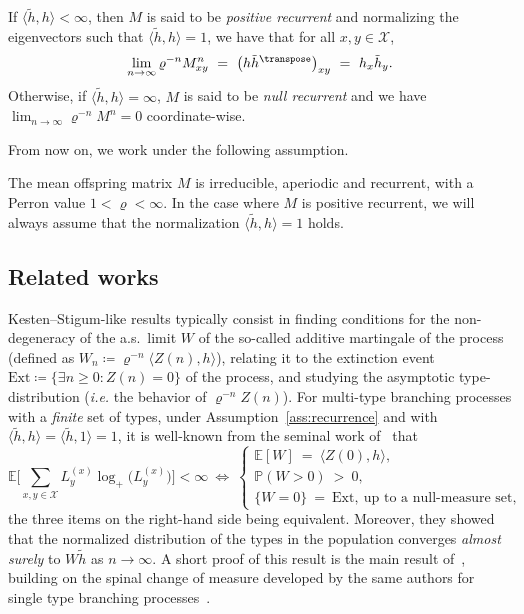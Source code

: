 \begin{refsegment}
\begin{prop}
  If $\langle \tilde{h}, h\rangle<\infty$, then  $M$ is said to be \emph{positive recurrent} and normalizing the eigenvectors such that $\langle \tilde{h}, h\rangle=1$, we have that for all $x,y\in \mathcal{X}$,
  \begin{equation*}
    \lim_{n\to\infty} \varrho^{-n}M^{n}_{xy}\ =\ \big(h\tilde{h}^\transpose\big)_{xy}\ =\  h_x\tilde{h}_y.
   \end{equation*}   
  Otherwise, if $\langle \tilde{h}, h\rangle=\infty$, $M$ is said to be \emph{null recurrent} and we have $\lim_{n\to\infty} \varrho^{-n}M^{n} = 0$ coordinate-wise.
\end{prop}
%
From now on, we work under the following assumption.
\begin{assumption}\label{ass:recurrence}
  The mean offspring matrix $M$ is irreducible, aperiodic and recurrent, with a Perron value $1<\varrho<\infty$. In the case where $M$ is positive recurrent, we will always assume that the normalization $\langle \tilde{h}, h\rangle=1$ holds.
\end{assumption}
%


\subsection*{Related works}
Kesten--Stigum-like results typically consist in finding conditions for the non-degeneracy of the a.s.\ limit $W$ of the so-called additive martingale of the process (defined as $W_n\coloneqq \varrho^{-n} \langle Z(n), h\rangle$), relating it to the extinction event $\mathrm{Ext}\coloneqq\{\exists n \geq 0 : Z(n)=0\}$ of the process, and studying the asymptotic type-distribution (\textit{i.e.} the behavior of $\varrho^{-n}Z(n)$).
For multi-type branching processes with a \textit{finite} set of types, under Assumption~\ref{ass:recurrence} and with $\langle  \tilde{h}, h \rangle=\langle \tilde{h} , 1\rangle =1$, it is well-known from the seminal work of~\cite{kesten_limit_1966} that 
\begin{equation*}
   \mathbb{E}\bigg[\sum_{x,y\in\mathcal{X}}L^{(x)}_y\log_+\big(L^{(x)}_y\big)\bigg]<\infty \ \Longleftrightarrow\  \begin{cases}
    \mathbb{E}[W]\ =\ \langle Z(0), h\rangle, \\ \mathbb{P}(W>0)\ >\ 0, \\ \{W=0\}\ =\ \mathrm{Ext},\  \text{up to a null-measure set},
   \end{cases}
\end{equation*}
the three items on the right-hand side being equivalent.
Moreover, they showed that the normalized distribution of the types in the population converges \textit{almost surely} to $W\tilde{h}$ as $n\to\infty$.
A short proof of this result is the main result of~\cite{kurtz_conceptual_1997}, building on the spinal change of measure developed by the same authors for single type branching processes~\citep{lyons_pemantle_peres_1995}.



\end{refsegment}
